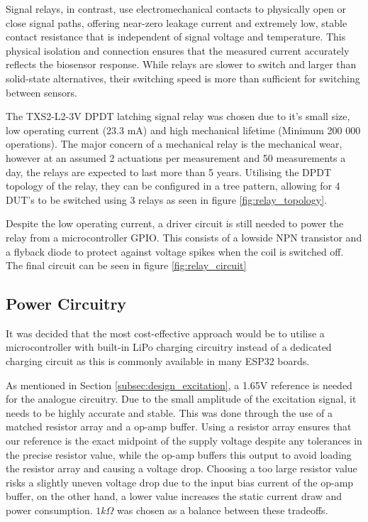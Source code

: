 Signal relays, in contrast, use electromechanical contacts to physically open or close signal paths, offering near-zero leakage current and extremely low, stable contact resistance that is independent of signal voltage and temperature. This physical isolation and connection ensures that the measured current accurately reflects the biosensor response. While relays are slower to switch and larger than solid-state alternatives, their switching speed is more than sufficient for switching between sensors.

The TXS2-L2-3V DPDT latching signal relay was chosen due to it's small size, low operating current (23.3 mA) and high mechanical lifetime (Minimum 200 000 operations). The major concern of a mechanical relay is the mechanical wear, however at an assumed 2 actuations per measurement and 50 measurements a day, the relays are expected to last more than 5 years. Utilising the DPDT topology of the relay, they can be configured in a tree pattern, allowing for 4 DUT's to be switched using 3 relays as seen in figure \ref{fig:relay_topology}. 

Despite the low operating current, a driver circuit is still needed to power the relay from a microcontroller GPIO. This consists of a lowside NPN transistor and a flyback diode to protect against voltage spikes when the coil is switched off. The final circuit can be seen in figure \ref{fig:relay_circuit}

\subsection{Power Circuitry}
 It was decided that the most cost-effective approach would be to utilise a microcontroller with built-in LiPo charging circuitry instead of a dedicated charging circuit as this is commonly available in many ESP32 boards.  

As mentioned in Section \ref{subsec:design_excitation}, a 1.65V reference is needed for the analogue circuitry. Due to the small amplitude of the excitation signal, it needs to be highly accurate and stable. This was done through the use of a matched resistor array and a op-amp buffer. Using a resistor array ensures that our reference is the exact midpoint of the supply voltage despite any tolerances in the precise resistor value, while the op-amp buffers this output to avoid loading the resistor array and causing a voltage drop. Choosing a too large resistor value risks a slightly uneven voltage drop due to the input bias current of the op-amp buffer, on the other hand, a lower value increases the static current draw and power consumption. $1k\Omega$ was chosen as a balance between these tradeoffs.

